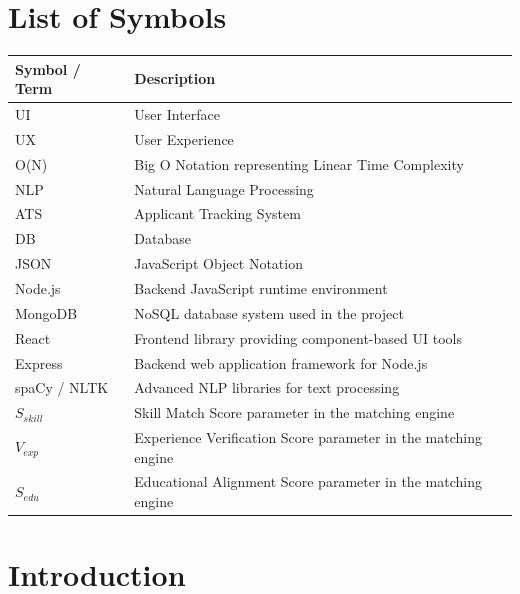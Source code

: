 \documentclass[12pt,a4paper]{report}
\begin{document}
\newpage

\chapter*{List of Symbols}

\begin{center}
\begin{tabular}{|l|p{9cm}|}
\hline
\textbf{Symbol / Term} & \textbf{Description} \\
\hline
UI & User Interface \\
\hline
UX & User Experience \\
\hline
O(N) & Big O Notation representing Linear Time Complexity \\
\hline
NLP & Natural Language Processing \\
\hline
ATS & Applicant Tracking System \\
\hline
DB & Database \\
\hline
JSON & JavaScript Object Notation \\
\hline
Node.js & Backend JavaScript runtime environment \\
\hline
MongoDB & NoSQL database system used in the project \\
\hline
React & Frontend library providing component-based UI tools \\
\hline
Express & Backend web application framework for Node.js \\
\hline
spaCy / NLTK & Advanced NLP libraries for text processing \\
\hline
$S_{skill}$ & Skill Match Score parameter in the matching engine \\
\hline
$V_{exp}$ & Experience Verification Score parameter in the matching engine \\
\hline
$S_{edu}$ & Educational Alignment Score parameter in the matching engine \\
\hline
\end{tabular}
\end{center}

\newpage
\clearpage
{}

\chapter{Introduction}
\end{document}
